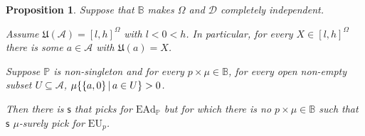 \documentclass[a4paper,final]{article}
\newtheorem{proposition}[theorem]{Proposition}
\newcommand\A{\mathcal{A}}
\renewcommand\P{\mathbb{P}} %
\newcommand\EU{\mathrm{EU}}
\newcommand\EAd{\mathrm{EAd}}
\newcommand\U{\mathfrak{U}} %
\newcommand{\Decs}{\mathcal{D}}
\newcommand\s{\mathsf{s}}
\newcommand{\IB}{\mathbb{B}}
\newcommand{\IP}{\P}
\newcommand\SetDelimiter[1][]{
	\nonscript\,#1\vert \allowbreak \nonscript\,\mathopen{}}
\providecommand\given{\SetDelimiter}
\newenvironment{CCM rewritten}
{\begingroup\color{blue}} %
{\endgroup}              %
\begin{document}
\begin{proposition}\label{thm:ead-existsimpermissible[dep]:spreadegtakeorleave}%
	Suppose that $\IB$ makes $\Omega$ and $\Decs$ completely independent. 
	
	Assume $\U(\A)=[l,h]^\Omega$ with $l<0<h$. In particular, for every $X\in [l,h]^\Omega$ there is some $a\in \A$ with $\U(a)=X$. 


	Suppose $\IP$ is non-singleton and for every $p \times \mu\in\IB$, for every open non-empty subset $U \subseteq\A$, $\mu\{\{a,0\}\given a\in U\}>0$.

Then there is $\s$ that picks for $\EAd_\IP$ but for which there is no $p\times\mu\in \IB$ such that $\s$ $\mu$-surely pick for $\EU_p$.
\end{proposition}
\end{document}

